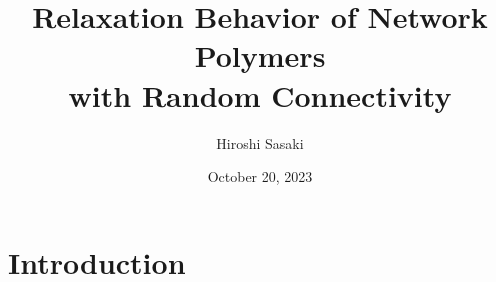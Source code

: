 \documentclass[12pt, dvipdfmx]{beamer}
\title
[Relaxation Behavior of Network Polymers with Random Connectivity]
{Relaxation Behavior of Network Polymers\\ with Random Connectivity}
\author[Toagosei H.Sasaki]{Hiroshi Sasaki}
\institute[Toagosei Co., Ltd.]{Toagosei Co., Ltd.}
\date{October 20, 2023}
\begin{document}
\setlength{\abovedisplayskip}{2pt} %
\setlength{\belowdisplayskip}{2pt} %

\begin{frame}[noframenumbering]\frametitle{}
	\titlepage
\end{frame}

\section{Introduction}
\end{document}
